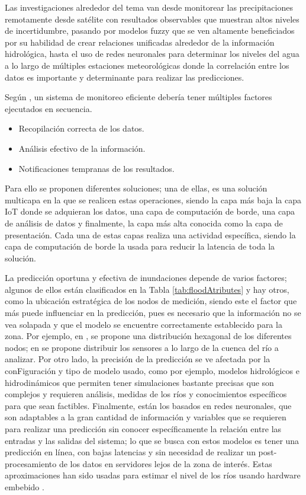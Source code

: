 Las investigaciones alrededor del tema van desde monitorear las precipitaciones remotamente desde satélite\cite{remoteSatellite,advancedForecast} con resultados observables que muestran altos niveles de incertidumbre, pasando por modelos fuzzy que se ven altamente beneficiados por su habilidad de crear relaciones unificadas alrededor de la información hidrológica, hasta el uso de redes neuronales para determinar los niveles del agua a lo largo de múltiples estaciones meteorológicas donde la correlación entre los datos es importante y determinante para realizar las predicciones\cite{Nguyen2014,floodfc1,floodfc2,floodfc3,floodfc4}.

Según \citep{floodAtributes}, un sistema de monitoreo eficiente debería tener múltiples factores ejecutados en secuencia.
\begin{itemize}
\item Recopilación correcta de los datos.
\item Análisis efectivo de la información.
\item Notificaciones tempranas de los resultados.
\end{itemize}

Para ello se proponen diferentes soluciones; una de ellas, es una solución multicapa en la que se realicen estas operaciones, siendo la capa más baja la capa IoT donde se adquieran los datos, una capa de computación de borde, una capa de análisis de datos y finalmente, la capa más alta conocida como la capa de presentación. Cada una de estas capas realiza una actividad específica, siendo la capa de computación de borde la usada para reducir la latencia de toda la solución.

La predicción oportuna y efectiva de inundaciones depende de varios factores; algunos de ellos están clasificados en la Tabla \ref{tab:floodAtributes} y hay otros, como la ubicación estratégica de los nodos de medición, siendo este el factor que más puede influenciar en la predicción, pues es necesario que la información no se vea solapada y que el modelo se encuentre correctamente establecido para la zona. Por ejemplo, en \citep{floodAtributes}, se propone una distribución hexagonal de los diferentes nodos; en \citep{floodfc3} se propone distribuir los sensores a lo largo de la cuenca del río a analizar. Por otro lado, la precisión de la predicción se ve afectada por la conFiguración y tipo de modelo usado, como por ejemplo, modelos hidrológicos e hidrodinámicos que permiten tener simulaciones bastante precisas \citep{merkuryeva2015advanced,ANN3} que son complejos y requieren análisis, medidas de los ríos y conocimientos específicos para que sean factibles. Finalmente, están los basados en redes neuronales, que son adaptables a la gran cantidad de información y variables que se requieren para realizar una predicción sin conocer específicamente la relación entre las entradas y las salidas del sistema; lo que se busca con estos modelos es tener una predicción en línea, con bajas latencias y sin necesidad de realizar un post-procesamiento de los datos en servidores lejos de la zona de interés. Estas aproximaciones han sido usadas para estimar el nivel de los ríos usando hardware embebido \cite{ANN1,ANN2,ANN3,ANN4,ANN5,ANN6,ANN7}.

